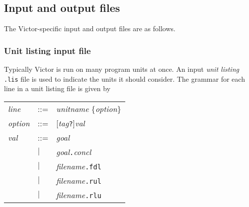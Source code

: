 \documentclass[12pt,fleqn]{article}
\begin{document}
\subsection{Input and output files}
The Victor-specific input and output files are as follows.

\subsubsection{Unit listing input file}
\label{sec:unit-listing-file}

Typically Victor is run on many program units at once.  An input
\emph{unit listing} \texttt{.lis} file is used to indicate the units
it should consider.  
%
The grammar for each line in a unit listing file is given by

\noindent
\begin{tabular}{lll}
\textit{line}  & ::= & \textit{unitname} \{\textit{option}\}  \\[2ex]
%
\textit{option} & ::= & [\textit{tag}\texttt{?}]\textit{val} \\[2ex]
%
\textit{val} & ::= &  \textit{goal} \\
    & $|$  &  \textit{goal}\texttt{.}\textit{concl} \\
    & $|$  &  \textit{filename}\texttt{.fdl} \\
    & $|$  &  \textit{filename}\texttt{.rul} \\
    & $|$  &  \textit{filename}\texttt{.rlu} 
\end{tabular}
\end{document}
